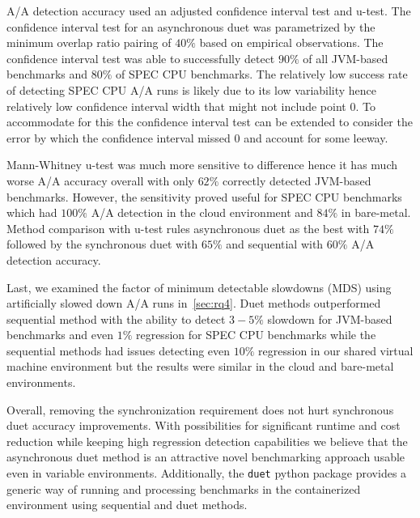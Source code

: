 A/A detection accuracy used an adjusted confidence interval test and \mbox{u-test}.
The confidence interval test for an asynchronous duet was parametrized by the minimum overlap ratio pairing of $40\%$ based on empirical observations.
The confidence interval test was able to successfully detect $90\%$ of all \mbox{JVM-based} benchmarks and $80\%$ of SPEC CPU benchmarks.
The relatively low success rate of detecting SPEC CPU A/A runs is likely due to its low variability hence relatively low confidence interval width that might not include point $0$.
To accommodate for this the confidence interval test can be extended to consider the error by which the confidence interval missed $0$ and account for some leeway.

\mbox{Mann-Whitney} \mbox{u-test} was much more sensitive to difference hence it has much worse A/A accuracy overall with only $62\%$ correctly detected \mbox{JVM-based} benchmarks.
However, the sensitivity proved useful for SPEC CPU benchmarks which had $100\%$ A/A detection in the cloud environment and $84\%$ in \mbox{bare-metal}.
Method comparison with \mbox{u-test} rules asynchronous duet as the best with $74\%$ followed by the synchronous duet with $65\%$ and sequential with $60\%$ A/A detection accuracy.

Last, we examined the factor of minimum detectable slowdowns (MDS) using artificially slowed down A/A runs in~\cref{sec:rq4}.
Duet methods outperformed sequential method with the ability to detect $3-5\%$ slowdown for \mbox{JVM-based} benchmarks and even $1\%$ regression for SPEC CPU benchmarks while the sequential methods had issues detecting even $10\%$ regression in our shared virtual machine environment but the results were similar in the cloud and bare-metal environments.

Overall, removing the synchronization requirement does not hurt synchronous duet accuracy improvements.
With possibilities for significant runtime and cost reduction while keeping high regression detection capabilities we believe that the asynchronous duet method is an attractive novel benchmarking approach usable even in variable environments.
Additionally, the \lstinline{duet} python package provides a generic way of running and processing benchmarks in the containerized environment using sequential and duet methods.

